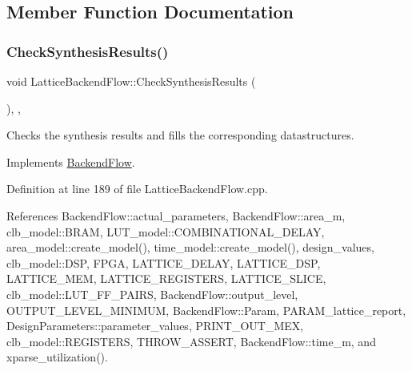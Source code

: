 \subsection{Member Function Documentation}
\mbox{\label{classLatticeBackendFlow_a31267aeb4a44638daab713102fe01306}} 
\subsubsection{\texorpdfstring{Check\+Synthesis\+Results()}{CheckSynthesisResults()}}
{\footnotesize\ttfamily void Lattice\+Backend\+Flow\+::\+Check\+Synthesis\+Results (\begin{DoxyParamCaption}{ }\end{DoxyParamCaption})\hspace{0.3cm}{\ttfamily [override]}, {\ttfamily [private]}, {\ttfamily [virtual]}}



Checks the synthesis results and fills the corresponding datastructures. 



Implements \hyperlink{classBackendFlow_ad2096d43b7c9c47611d719188215f23f}{Backend\+Flow}.



Definition at line 189 of file Lattice\+Backend\+Flow.\+cpp.



References Backend\+Flow\+::actual\+\_\+parameters, Backend\+Flow\+::area\+\_\+m, clb\+\_\+model\+::\+B\+R\+AM, L\+U\+T\+\_\+model\+::\+C\+O\+M\+B\+I\+N\+A\+T\+I\+O\+N\+A\+L\+\_\+\+D\+E\+L\+AY, area\+\_\+model\+::create\+\_\+model(), time\+\_\+model\+::create\+\_\+model(), design\+\_\+values, clb\+\_\+model\+::\+D\+SP, F\+P\+GA, L\+A\+T\+T\+I\+C\+E\+\_\+\+D\+E\+L\+AY, L\+A\+T\+T\+I\+C\+E\+\_\+\+D\+SP, L\+A\+T\+T\+I\+C\+E\+\_\+\+M\+EM, L\+A\+T\+T\+I\+C\+E\+\_\+\+R\+E\+G\+I\+S\+T\+E\+RS, L\+A\+T\+T\+I\+C\+E\+\_\+\+S\+L\+I\+CE, clb\+\_\+model\+::\+L\+U\+T\+\_\+\+F\+F\+\_\+\+P\+A\+I\+RS, Backend\+Flow\+::output\+\_\+level, O\+U\+T\+P\+U\+T\+\_\+\+L\+E\+V\+E\+L\+\_\+\+M\+I\+N\+I\+M\+UM, Backend\+Flow\+::\+Param, P\+A\+R\+A\+M\+\_\+lattice\+\_\+report, Design\+Parameters\+::parameter\+\_\+values, P\+R\+I\+N\+T\+\_\+\+O\+U\+T\+\_\+\+M\+EX, clb\+\_\+model\+::\+R\+E\+G\+I\+S\+T\+E\+RS, T\+H\+R\+O\+W\+\_\+\+A\+S\+S\+E\+RT, Backend\+Flow\+::time\+\_\+m, and xparse\+\_\+utilization().

